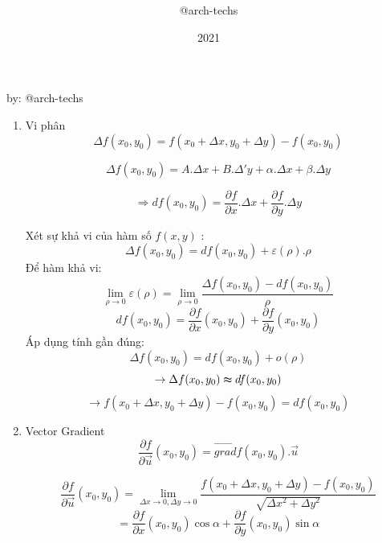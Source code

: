 \documentclass[12pt,a4paper]{report}
\title{\framebox {
        \textcolor{TEcolor}{
            \Huge {    CALCULUS II    }
        }
    }    }
\author{\Large @arch-techs}
\date{2021}
\begin{document}
{\selectfont
\begin{titlepage}
\maketitle
\end{titlepage}
\newpage

\begin{center}
    \begin{center}
    \end{center}
    
    \vspace{5mm}
    
    by: @arch-techs
    
    \vspace{1cm}
    
    \begin{enumerate}
        \item Vi phân
            \[\Delta f(x_{0}, y_{0}) = f(x_{0} + \Delta x, y_{0} + \Delta y) - f(x_{0}, y_{0})\]

            \[\Delta f(x_{0}, y_{0}) = A.\Delta x + B.\Delta'
             y + \alpha.\Delta x + \beta . \Delta y\]

             \[\Rightarrow df(x_0, y_{0}) = \dfrac{\partial f}{\partial x}.\Delta x + \dfrac{\partial f}{\partial y}.\Delta y\]

            Xét sự khả vi của hàm số $f(x, y)$ :
            \[\Delta f(x_{0}, y_{0}) = df(x_{0}, y_{0}) + \varepsilon (\rho ). \rho\]
            Để hàm khả vi:
            \[\lim_{\rho \to 0} \varepsilon(\rho) = \lim_{\rho \to 0} \dfrac{\Delta f(x_{0}, y_{0}) - df(x_{0}, y_{0})}{\rho}\]
            \[df(x_{0}, y_{0}) = \dfrac{\partial f}{\partial x}(x_{0}, y_{0}) + \dfrac{\partial f}{\partial y}(x_{0}, y_{0})\]
            Áp dụng tính gần đúng:
            \[\Delta f(x_{0}, y_{0}) = df(x_{0}, y_{0}) + o(\rho)\]
            \[\rightarrow \Delta f(x_{0}, y_{0}) \thickapprox df(x_{0}, y_{0})\]
            \[\rightarrow f(x_{0} + \Delta x, y_{0} + \Delta y) - f(x_0, y_{0}) = df(x_{0}, y_{0}) \]

        \item Vector Gradient
            \[\dfrac{\partial f}{\partial \overrightarrow{u}}(x_{0}, y_{0}) = \overrightarrow{grad}f(x_{0}, y_{0}) . \overrightarrow{u} \]
            
            \[\dfrac{\partial f}{\partial \overrightarrow{u}}(x_{0}, y_{0}) = \lim_{\Delta x \to 0, \Delta y \to 0}\dfrac{f(x_{0} + \Delta x, y_{0} + \Delta y) - f(x_{0}, y_{0})}{\sqrt{\Delta x ^{2}+ \Delta y^{2}}}\]    
            \[= \dfrac{\partial f}{\partial x}(x_{0}, y_{0})\cos \alpha + \dfrac{\partial f}{\partial y}(x_{0}, y_{0})\sin \alpha\]



\end{enumerate}
\end{center}}
\end{document}
